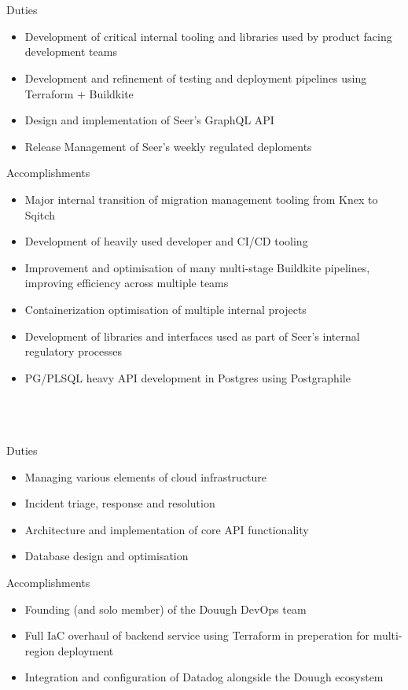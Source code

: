 \documentclass{resume}
\begin{document}
 \\
 \\
Duties \\
\begin{itemize}
  \item Development of critical internal tooling and libraries used by product facing development teams
  \item Development and refinement of testing and deployment pipelines using Terraform + Buildkite
  \item Design and implementation of Seer's GraphQL API
  \item Release Management of Seer's weekly regulated deploments
\end{itemize}
Accomplishments \\
\begin{itemize}
  \item Major internal transition of migration management tooling from Knex to Sqitch
  \item Development of heavily used developer and CI/CD tooling
  \item Improvement and optimisation of many multi-stage Buildkite pipelines, improving efficiency across multiple teams
  \item Containerization optimisation of multiple internal projects
  \item Development of libraries and interfaces used as part of Seer's internal regulatory processes
  \item PG/PLSQL heavy API development in Postgres using Postgraphile
\end{itemize}

 \\
 \\
 \\
Duties \\
\begin{itemize}
  \item Managing various elements of cloud infrastructure
  \item Incident triage, response and resolution
  \item Architecture and implementation of core API functionality
  \item Database design and optimisation
\end{itemize}
Accomplishments \\
\begin{itemize}
  \item Founding (and solo member) of the Douugh DevOps team
  \item Full IaC overhaul of backend service using Terraform in preperation for multi-region deployment
  \item Integration and configuration of Datadog alongside the Douugh ecosystem
\end{itemize}
\end{document}
